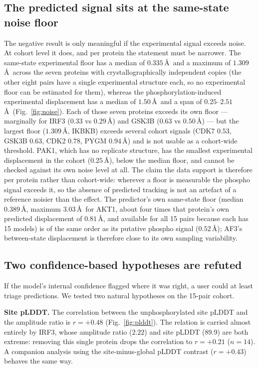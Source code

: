 \subsection{The predicted signal sits at the same-state noise floor}
\label{sec:res-noise}

The negative result is only meaningful if the experimental signal exceeds
noise. At cohort level it does, and per protein the statement must be
narrower. The same-state experimental floor has a median of
$0.335$\,\AA\ and a maximum of $1.309$\,\AA\ across the seven proteins
with crystallographically independent copies (the other eight pairs have a
single experimental structure each, so no experimental floor can be
estimated for them), whereas the
phosphorylation-induced experimental displacement has a median of
$1.50$\,\AA\ and a span of $0.25$--$2.51$\,\AA\ (Fig.~\ref{fig:noise}).
Each of those seven proteins exceeds its own floor --- marginally for IRF3
($0.33$ vs $0.29$\,\AA) and GSK3B ($0.63$ vs $0.50$\,\AA) --- but the
largest floor ($1.309$\,\AA, IKBKB) exceeds several cohort signals (CDK7
$0.53$, GSK3B $0.63$, CDK2 $0.78$, PYGM $0.94$\,\AA) and is not usable as a
cohort-wide threshold. PAK1, which has no replicate structure, has the
smallest experimental displacement in the cohort ($0.25$\,\AA), below the
median floor, and cannot be checked against its own noise level at all. The
claim the data support is therefore per protein rather than cohort-wide:
wherever a floor is measurable the phospho signal exceeds it, so the
absence of predicted tracking is not an artefact of a reference noisier
than the effect. The predictor's own same-state floor (median
$0.389$\,\AA, maximum $3.03$\,\AA\ for AKT1, about four times that protein's
own predicted displacement of $0.81$\,\AA, and available for all 15 pairs
because each has 15 models) is of
the same order as its putative phospho signal
($0.52$\,\AA); AF3's between-state displacement is therefore close to its
own sampling variability.

\subsection{Two confidence-based hypotheses are refuted}
\label{sec:res-confidence}

If the model's internal confidence flagged where it was right, a user
could at least triage predictions. We tested two natural hypotheses on the
15-pair cohort.

\noindent\textbf{Site pLDDT.} The correlation between the
unphosphorylated site pLDDT and the amplitude ratio is $r=+0.48$
(Fig.~\ref{fig:plddt}). The relation is carried almost entirely by IRF3,
whose amplitude ratio ($2.22$) and site pLDDT (89.9) are both extreme:
removing this single protein drops the correlation to $r=+0.21$
($n=14$). A companion analysis using the site-minus-global pLDDT contrast
($r=+0.43$) behaves the same way.

